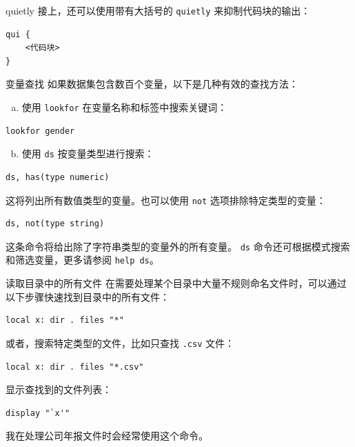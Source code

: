\documentclass[
  ignorenonframetext,
  aspectratio=169,
  fontset=ubuntu]{ctexbeamer}
\providecommand{\tightlist}{%
  \setlength{\itemsep}{0pt}\setlength{\parskip}{0pt}}
\begin{document}
\begin{frame}[fragile]{quietly}
\label{quietly}
接上，还可以使用带有大括号的 \texttt{quietly}
来抑制代码块的输出：

\begin{verbatim}
qui {
    <代码块>
}
\end{verbatim}
\end{frame}

\begin{frame}[fragile]{变量查找}
\label{ux53d8ux91cfux67e5ux627e}
如果数据集包含数百个变量，以下是几种有效的查找方法：

\begin{enumerate}
[(a)]
\tightlist
\item
  使用 \texttt{lookfor} 在变量名称和标签中搜索关键词：
\end{enumerate}

\begin{verbatim}
lookfor gender
\end{verbatim}

\begin{enumerate}
[(a)]
\setcounter{enumi}{1}
\tightlist
\item
  使用 \texttt{ds} 按变量类型进行搜索：
\end{enumerate}

\begin{verbatim}
ds, has(type numeric)
\end{verbatim}

这将列出所有数值类型的变量。也可以使用 \texttt{not}
选项排除特定类型的变量：

\begin{verbatim}
ds, not(type string)
\end{verbatim}

这条命令将给出除了字符串类型的变量外的所有变量。 \texttt{ds}
命令还可根据模式搜索和筛选变量，更多请参阅
\texttt{help ds}。
\end{frame}

\begin{frame}[fragile]{读取目录中的所有文件}
\label{ux8bfbux53d6ux76eeux5f55ux4e2dux7684ux6240ux6709ux6587ux4ef6}
在需要处理某个目录中大量不规则命名文件时，可以通过以下步骤快速找到目录中的所有文件：

\begin{verbatim}
local x: dir . files "*"
\end{verbatim}

或者，搜索特定类型的文件，比如只查找 \texttt{.csv} 文件：

\begin{verbatim}
local x: dir . files "*.csv"
\end{verbatim}

显示查找到的文件列表：

\begin{verbatim}
display "`x'"
\end{verbatim}

我在处理公司年报文件时会经常使用这个命令。
\end{frame}
\end{document}
